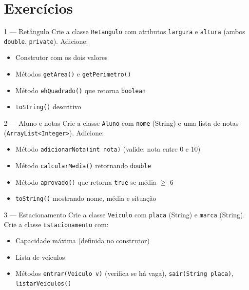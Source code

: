 \documentclass[12pt, a4paper]{article}
\newcommand{\code}[1]{\texttt{\color{javaDeep}#1}}
\begin{document}
\section{Exercícios}

\begin{exercicio}{1 --- Retângulo}
Crie a classe \code{Retangulo} com atributos \code{largura} e \code{altura} (ambos \code{double}, \code{private}). Adicione:
\begin{itemize}
  \item Construtor com os dois valores
  \item Métodos \code{getArea()} e \code{getPerimetro()}
  \item Método \code{ehQuadrado()} que retorna \code{boolean}
  \item \code{toString()} descritivo
\end{itemize}
\end{exercicio}

\begin{exercicio}{2 --- Aluno e notas}
Crie a classe \code{Aluno} com \code{nome} (String) e uma lista de notas (\code{ArrayList<Integer>}). Adicione:
\begin{itemize}
  \item Método \code{adicionarNota(int nota)} (valide: nota entre 0 e 10)
  \item Método \code{calcularMedia()} retornando \code{double}
  \item Método \code{aprovado()} que retorna \code{true} se média $\geq$ 6
  \item \code{toString()} mostrando nome, média e situação
\end{itemize}
\end{exercicio}

\begin{exercicio}{3 --- Estacionamento}
Crie a classe \code{Veiculo} com \code{placa} (String) e \code{marca} (String). Crie a classe \code{Estacionamento} com:
\begin{itemize}
  \item Capacidade máxima (definida no construtor)
  \item Lista de veículos
  \item Métodos \code{entrar(Veiculo v)} (verifica se há vaga), \code{sair(String placa)}, \code{listarVeiculos()}
\end{itemize}
\end{exercicio}
\end{document}
